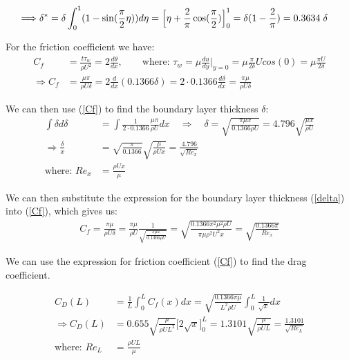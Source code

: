 \documentclass[a4paper,10pt]{book}
\begin{document}
\begin{align}
\begin{split}
\Longrightarrow \delta^* &= \delta \int_0^1 (1- \sin(\frac{\pi}{2} \eta)) d \eta
= \Big[ \eta + \frac{2}{\pi} \cos (\frac{\pi}{2}) \Big]_0^1
= \delta (1- \frac{2}{\pi}) = 0.3634 \hspace{1mm} \delta \label{deltastar2}
\end{split}
\end{align}

For the friction coefficient we have:\\
\begin{align}
C_f &= \frac{t \tau _w}{\rho U^2} = 2 \frac{d \theta}{d x}, \nonumber 
\quad \quad \text{where: } \tau_w = \mu \frac{d u}{d y}\bigg\rvert_{y=0} = \mu \frac{\pi}{2 \delta} U cos(0) 
= \mu \frac{\pi U}{2 \delta} \nonumber \\
\Longrightarrow C_f &= \frac{\mu \pi}{\rho U \delta} = 2 \frac{d}{dx}(0.1366 \delta) 
= 2 \cdot 0.1366 \frac{d \delta}{d x} = \frac{\pi \mu}{\rho U \delta} \label{Cf}
\end{align}
 
We can then use (\ref{Cf}) to find the boundary layer thickness $\delta$:
\begin{align}
\int \delta d \delta &= \int \frac{1}{2 \cdot 0.1366} \frac{\mu \pi}{\rho U} dx \quad
\Rightarrow \quad \delta = \sqrt{\frac{\pi \mu x}{0.1366 \rho U}} = 4.796 \sqrt{\frac{\mu x}{\rho U}} 
\label{delta} \\
\Rightarrow \frac{\delta}{x} &= \sqrt{\frac{\pi}{0.1366}} \sqrt{\frac{\mu}{\rho U x}} = \frac{4.796}{\sqrt{Re_x}}
\label{deltax}\\
\text{where: } Re_x &= \frac{\rho U x}{\mu} \nonumber
\end{align}

We can then substitute the expression for the boundary layer thickness (\ref{delta}) into (\ref{Cf}), which gives us:
\begin{align}
C_f = \frac{\pi \mu}{\rho U \delta} = \frac{\pi \mu}{\rho U} \frac{1}{\sqrt{\frac{\pi \mu x}{0.1366 \rho U}}} 
= \sqrt{\frac{0.1366 \pi^2 \mu^2 \rho U}{\pi \mu \rho^2 U^2 x}} = \sqrt{\frac{0.1366 \pi}{Re_x}} 
\end{align}

We can use the expression for friction coefficient (\ref{Cf}) to find the drag coefficient.

\begin{align}
C_D (L) &= \frac{1}{L} \int_0^L C_f(x) dx = 
\sqrt{\frac{0.1366 \pi \mu}{L^2 \rho U}} \int_0^L \frac{1}{\sqrt{x}} dx \nonumber \\
\Rightarrow C_D(L) &= 0.655 \sqrt{\frac{\mu}{\rho U L^2}} \Big[2 \sqrt{x} \Big]_0^L 
= 1.3101 \sqrt{\frac{\mu}{\rho U L}} = \frac{1.3101}{\sqrt{Re_L}} \label{Cd} \\
\text{where: } Re_L &= \frac{\rho U L}{\mu} \nonumber
\end{align}
\end{document}
